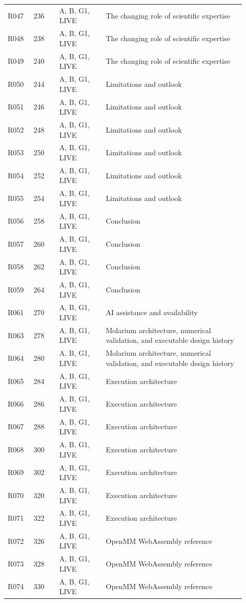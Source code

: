 \documentclass[11pt]{article}
\begin{document}
\begin{longtable}{@{}p{0.10\linewidth}p{0.10\linewidth}p{0.18\linewidth}p{0.54\linewidth}@{}}
R047 & 236 & A, B, G1, LIVE & The changing role of scientific expertise \\
R048 & 238 & A, B, G1, LIVE & The changing role of scientific expertise \\
R049 & 240 & A, B, G1, LIVE & The changing role of scientific expertise \\
R050 & 244 & A, B, G1, LIVE & Limitations and outlook \\
R051 & 246 & A, B, G1, LIVE & Limitations and outlook \\
R052 & 248 & A, B, G1, LIVE & Limitations and outlook \\
R053 & 250 & A, B, G1, LIVE & Limitations and outlook \\
R054 & 252 & A, B, G1, LIVE & Limitations and outlook \\
R055 & 254 & A, B, G1, LIVE & Limitations and outlook \\
R056 & 258 & A, B, G1, LIVE & Conclusion \\
R057 & 260 & A, B, G1, LIVE & Conclusion \\
R058 & 262 & A, B, G1, LIVE & Conclusion \\
R059 & 264 & A, B, G1, LIVE & Conclusion \\
R061 & 270 & A, B, G1, LIVE & AI assistance and availability \\
R063 & 278 & A, B, G1, LIVE & Molarium architecture, numerical validation, and executable design history \\
R064 & 280 & A, B, G1, LIVE & Molarium architecture, numerical validation, and executable design history \\
R065 & 284 & A, B, G1, LIVE & Execution architecture \\
R066 & 286 & A, B, G1, LIVE & Execution architecture \\
R067 & 288 & A, B, G1, LIVE & Execution architecture \\
R068 & 300 & A, B, G1, LIVE & Execution architecture \\
R069 & 302 & A, B, G1, LIVE & Execution architecture \\
R070 & 320 & A, B, G1, LIVE & Execution architecture \\
R071 & 322 & A, B, G1, LIVE & Execution architecture \\
R072 & 326 & A, B, G1, LIVE & OpenMM WebAssembly reference \\
R073 & 328 & A, B, G1, LIVE & OpenMM WebAssembly reference \\
R074 & 330 & A, B, G1, LIVE & OpenMM WebAssembly reference \\

\end{longtable}
\end{document}
